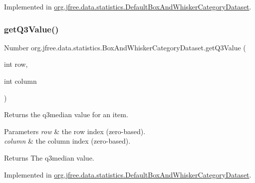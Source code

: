 Implemented in \mbox{\hyperlink{classorg_1_1jfree_1_1data_1_1statistics_1_1_default_box_and_whisker_category_dataset_a7eccedd56414d1898ad1f2844ba2ac1f}{org.\+jfree.\+data.\+statistics.\+Default\+Box\+And\+Whisker\+Category\+Dataset}}.

\mbox{\label{interfaceorg_1_1jfree_1_1data_1_1statistics_1_1_box_and_whisker_category_dataset_a54e8f4036ef00bd3674b490096ea44a2}} 
\subsubsection{\texorpdfstring{get\+Q3\+Value()}{getQ3Value()}\hspace{0.1cm}{\footnotesize\ttfamily [1/2]}}
{\footnotesize\ttfamily Number org.\+jfree.\+data.\+statistics.\+Box\+And\+Whisker\+Category\+Dataset.\+get\+Q3\+Value (\begin{DoxyParamCaption}\item[{int}]{row,  }\item[{int}]{column }\end{DoxyParamCaption})}

Returns the q3median value for an item.


\begin{DoxyParams}{Parameters}
{\em row} & the row index (zero-\/based). \\
\hline
{\em column} & the column index (zero-\/based).\\
\hline
\end{DoxyParams}
\begin{DoxyReturn}{Returns}
The q3median value. 
\end{DoxyReturn}


Implemented in \mbox{\hyperlink{classorg_1_1jfree_1_1data_1_1statistics_1_1_default_box_and_whisker_category_dataset_ac0f6a03c68dbec0f36b4c0e3e6005ba4}{org.\+jfree.\+data.\+statistics.\+Default\+Box\+And\+Whisker\+Category\+Dataset}}.

\mbox{\label{interfaceorg_1_1jfree_1_1data_1_1statistics_1_1_box_and_whisker_category_dataset_a2dfb9e06fad335ed51a486a44ae18acb}} 
